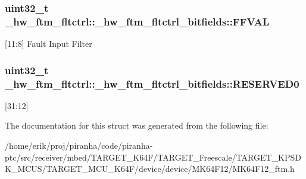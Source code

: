 \subsubsection[{\texorpdfstring{F\+F\+V\+AL}{FFVAL}}]{\setlength{\rightskip}{0pt plus 5cm}uint32\+\_\+t \+\_\+hw\+\_\+ftm\+\_\+fltctrl\+::\+\_\+hw\+\_\+ftm\+\_\+fltctrl\+\_\+bitfields\+::\+F\+F\+V\+AL}\hypertarget{struct__hw__ftm__fltctrl_1_1__hw__ftm__fltctrl__bitfields_a3961fe405148b2f7569d074cfdefa1dc}{}\label{struct__hw__ftm__fltctrl_1_1__hw__ftm__fltctrl__bitfields_a3961fe405148b2f7569d074cfdefa1dc}
\mbox{[}11\+:8\mbox{]} Fault Input Filter 
\subsubsection[{\texorpdfstring{R\+E\+S\+E\+R\+V\+E\+D0}{RESERVED0}}]{\setlength{\rightskip}{0pt plus 5cm}uint32\+\_\+t \+\_\+hw\+\_\+ftm\+\_\+fltctrl\+::\+\_\+hw\+\_\+ftm\+\_\+fltctrl\+\_\+bitfields\+::\+R\+E\+S\+E\+R\+V\+E\+D0}\hypertarget{struct__hw__ftm__fltctrl_1_1__hw__ftm__fltctrl__bitfields_a80f6f4bc0c60308a0d8146057b2cdb0c}{}\label{struct__hw__ftm__fltctrl_1_1__hw__ftm__fltctrl__bitfields_a80f6f4bc0c60308a0d8146057b2cdb0c}
\mbox{[}31\+:12\mbox{]} 

The documentation for this struct was generated from the following file\+:\begin{DoxyCompactItemize}
\item 
/home/erik/proj/piranha/code/piranha-\/ptc/src/receiver/mbed/\+T\+A\+R\+G\+E\+T\+\_\+\+K64\+F/\+T\+A\+R\+G\+E\+T\+\_\+\+Freescale/\+T\+A\+R\+G\+E\+T\+\_\+\+K\+P\+S\+D\+K\+\_\+\+M\+C\+U\+S/\+T\+A\+R\+G\+E\+T\+\_\+\+M\+C\+U\+\_\+\+K64\+F/device/device/\+M\+K64\+F12/M\+K64\+F12\+\_\+ftm.\+h\end{DoxyCompactItemize}
